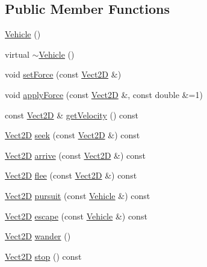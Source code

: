 \subsection*{Public Member Functions}
\begin{DoxyCompactItemize}
\item 
\hyperlink{classVehicle_abaad8187d9f2ede4fb8ea18de0a6764c_abaad8187d9f2ede4fb8ea18de0a6764c}{Vehicle} ()
\item 
virtual \hyperlink{classVehicle_a61ab140c755b8e0e824d54117cf4546f_a61ab140c755b8e0e824d54117cf4546f}{$\sim$\+Vehicle} ()
\item 
void \hyperlink{classVehicle_a03e22c522e6f526f95428c81d0762833_a03e22c522e6f526f95428c81d0762833}{set\+Force} (const \hyperlink{classVect2D}{Vect2D} \&)
\item 
void \hyperlink{classVehicle_a82fbbd5aafc1ba89c3daa4da09989bbe_a82fbbd5aafc1ba89c3daa4da09989bbe}{apply\+Force} (const \hyperlink{classVect2D}{Vect2D} \&, const double \&=1)
\item 
const \hyperlink{classVect2D}{Vect2D} \& \hyperlink{classVehicle_a87b8266cb3495e8444233a0724e1bf07_a87b8266cb3495e8444233a0724e1bf07}{get\+Velocity} () const
\item 
\hyperlink{classVect2D}{Vect2D} \hyperlink{classVehicle_a86c0b5ddcf64443bc090657cd29832bf_a86c0b5ddcf64443bc090657cd29832bf}{seek} (const \hyperlink{classVect2D}{Vect2D} \&) const
\item 
\hyperlink{classVect2D}{Vect2D} \hyperlink{classVehicle_a55f8bb6cfbdd97219c2cea6cf3ad3826_a55f8bb6cfbdd97219c2cea6cf3ad3826}{arrive} (const \hyperlink{classVect2D}{Vect2D} \&) const
\item 
\hyperlink{classVect2D}{Vect2D} \hyperlink{classVehicle_ac7dbbb2942b8d642b2ab071def1c2fdb_ac7dbbb2942b8d642b2ab071def1c2fdb}{flee} (const \hyperlink{classVect2D}{Vect2D} \&) const
\item 
\hyperlink{classVect2D}{Vect2D} \hyperlink{classVehicle_a9dd4f4a06b4abd3324d317c27bb867d2_a9dd4f4a06b4abd3324d317c27bb867d2}{pursuit} (const \hyperlink{classVehicle}{Vehicle} \&) const
\item 
\hyperlink{classVect2D}{Vect2D} \hyperlink{classVehicle_ae5fbf395cbebf51498cbe8b2baaddc16_ae5fbf395cbebf51498cbe8b2baaddc16}{escape} (const \hyperlink{classVehicle}{Vehicle} \&) const
\item 
\hyperlink{classVect2D}{Vect2D} \hyperlink{classVehicle_af9da94116706c94e5f26df42c258dc6e_af9da94116706c94e5f26df42c258dc6e}{wander} ()
\item 
\hyperlink{classVect2D}{Vect2D} \hyperlink{classVehicle_a9a1cb1e5dab4a474fbe0c1c49482d0ee_a9a1cb1e5dab4a474fbe0c1c49482d0ee}{stop} () const

\end{DoxyCompactItemize}

